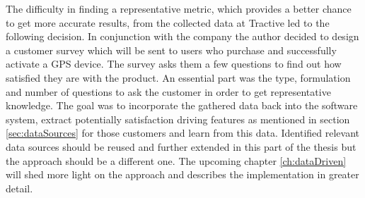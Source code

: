 The difficulty in finding a representative metric, which provides a better chance to get more accurate results, from the collected data at Tractive led to the following decision. In conjunction with the company the author decided to design a customer survey which will be sent to users who purchase and successfully activate a GPS device. The survey asks them a few questions to find out how satisfied they are with the product. An essential part was the type, formulation and number of questions to ask the customer in order to get representative knowledge. The goal was to incorporate the gathered data back into the software system, extract potentially satisfaction driving features as mentioned in section \ref{sec:dataSources} for those customers and learn from this data. Identified relevant data sources should be reused and further extended in this part of the thesis but the approach should be a different one. The upcoming chapter \ref{ch:dataDriven} will shed more light on the approach and describes the implementation in greater detail. 




 

